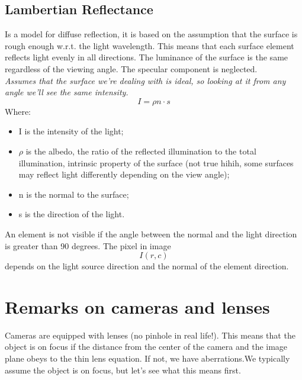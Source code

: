 \subsection{Lambertian Reflectance}
Is a model for diffuse reflection, it is based on the assumption that the surface is rough enough w.r.t. the light wavelength. This means that each surface element reflects light evenly in all directions. The luminance of the surface is the same regardless of the viewing angle. The specular component is neglected.
\\\textit{Assumes that the surface we're dealing with is ideal, so looking at it from any angle we'll see the same intensity.}
\[
    I = \rho n \cdot s
\]
Where:
\begin{itemize}
    \item I is the intensity of the light;
    \item $\rho$ is the albedo, the ratio of the reflected illumination to the total illumination, intrinsic property of the surface (not true hihih, some surfaces may reflect light differently depending on the view angle);
    \item n is the normal to the surface;
    \item s is the direction of the light.
\end{itemize}
An element is not visible if the angle between the normal and the light direction is greater than 90 degrees.
The pixel in image \[I(r,c)\] depends on the light source direction and the normal of the element direction.

\section{Remarks on cameras and lenses}
Cameras are equipped with lenses (no pinhole in real life!). This means that the object is on focus if the distance from the center of the
camera and the image plane obeys to the thin lens equation. If not, we have aberrations.We typically assume the object is on focus, but let’s see what this means first.
